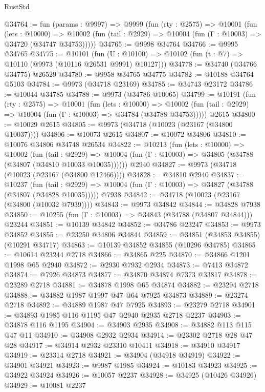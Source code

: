 \begin{lexlean}{RustStd}
\begin{coremodule}
@34764 := fun (params : @9997) =>
  @9999
    (fun (rty : @2575) =>
    @10001
      (fun (lets : @10000) =>
      @10002 (fun (tail : @2929) => @10004 (fun (Γ : @10003) => @34720 (@34747 @34753)))))
@34765 := @9998 @34764
@34766 := @9995 @34765
@34775 := @10101
    (fun (U : @10100) => @10102 (fun (t : @7) => @10110 (@9973 (@10116 @26531 @9991) @10127)))
@34778 := @34740 (@34766 @34775) @26529
@34780 := @9958 @34765 @34775
@34782 := @10188 @34764 @5103
@34784 := @9973 (@34718 @23169)
@34785 := @34743 @23172
@34786 := @10044 @34785
@34788 := @9973 (@34786 @10065)
@34799 := @10191
    (fun (rty : @2575) =>
    @10001
      (fun (lets : @10000) =>
      @10002 (fun (tail : @2929) => @10004 (fun (Γ : @10003) => @34784 (@34788 @34753)))))
    @2615
@34800 := @10029 @2615
@34805 := @9973 (@34718 (@10023 (@23167 (@34800 @10037))))
@34806 := @10073 @2615
@34807 := @10072 @34806
@34810 := @10076 @34806 @34748 @26534
@34822 := @10213
    (fun (lets : @10000) =>
    @10002
      (fun (tail : @2929) =>
      @10004 (fun (Γ : @10003) => @34805 (@34788 (@34807 (@34810 @10033 @10035))))))
    @2940
@34827 := @9973 (@34718 (@10023 (@23167 (@34800 @12466))))
@34828 := @34810 @2940
@34837 := @10237
    (fun (tail : @2929) => @10004 (fun (Γ : @10003) => @34827 (@34788 (@34807 (@34828 @10035)))))
    @7938
@34842 := @34718 (@10023 (@23167 (@34800 (@10032 @7939))))
@34843 := @9973 @34842
@34844 := @34828 @7938
@34850 := @10255 (fun (Γ : @10003) => @34843 (@34788 (@34807 @34844))) @23244
@34851 := @10139 @34842
@34852 := @34786 @23247
@34853 := @9973 @34852
@34855 := @23250 @34806 @34844
@34859 := @34851 (@34853 @34855) (@10291 @34717)
@34863 := @10139 @34852 @34855 (@10296 @34785)
@34865 := @10614 @23244 @2718
@34866 := @34865 @225
@34870 := @34866 @1201 @1998 @65 @2940
@34872 := @2930 @7932 @2934
@34873 := @7413 @34872
@34874 := @7926 @34873
@34877 := @34870 @34874 @7373 @33817
@34878 := @23289 @2718
@34881 := @34878 @1998 @65 @34874
@34882 := @23294 @2718
@34888 := @34882 @1987 @1997 @47 @64 @7925 @34873
@34889 := @23274 @2718
@34892 := @34889 @1987 @47 @7925
@34893 := @23279 @2718
@34901 := @34893 @1985 @116 @1195 @47 @2940 @2935 @2718 @2237
@34903 := @34878 @116 @1195
@34904 := @34903 @2935
@34908 := @34882 @113 @115 @47 @11
@34910 := @34908 @2932 @2934
@34914 := @23302 @2718 @28 @47 @28
@34917 := @34914 @2932 @23310 @10411
@34918 := @34910 @34917
@34919 := @23314 @2718
@34921 := @34904 (@34918 @34919)
@34922 := @34901 @34921
@34923 := @9987 @1985
@34924 := @10183 @34923
@34925 := @34922 @34924
@34926 := @10057 @2237
@34928 := @34925 (@10426 @34926)
@34929 := @10081 @2237

\end{coremodule}
\end{lexlean}
